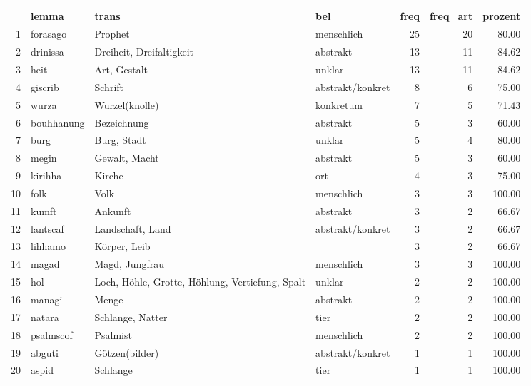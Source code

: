 \begin{tabular}{rlllrrr}
  \hline
 & lemma & trans & bel & freq & freq\_art & prozent \\ 
  \hline
1 & forasago & Prophet & menschlich &  25 &  20 & 80.00 \\ 
  2 & drinissa & Dreiheit, Dreifaltigkeit & abstrakt &  13 &  11 & 84.62 \\ 
  3 & heit & Art, Gestalt & unklar &  13 &  11 & 84.62 \\ 
  4 & giscrib & Schrift & abstrakt/konkret &   8 &   6 & 75.00 \\ 
  5 & wurza & Wurzel(knolle) & konkretum &   7 &   5 & 71.43 \\ 
  6 & bouhhanung & Bezeichnung & abstrakt &   5 &   3 & 60.00 \\ 
  7 & burg & Burg, Stadt & unklar &   5 &   4 & 80.00 \\ 
  8 & megin & Gewalt, Macht & abstrakt &   5 &   3 & 60.00 \\ 
  9 & kirihha & Kirche & ort &   4 &   3 & 75.00 \\ 
  10 & folk & Volk & menschlich &   3 &   3 & 100.00 \\ 
  11 & kumft & Ankunft & abstrakt &   3 &   2 & 66.67 \\ 
  12 & lantscaf & Landschaft, Land & abstrakt/konkret &   3 &   2 & 66.67 \\ 
  13 & lihhamo & Körper, Leib &  &   3 &   2 & 66.67 \\ 
  14 & magad & Magd, Jungfrau & menschlich &   3 &   3 & 100.00 \\ 
  15 & hol & Loch, Höhle, Grotte, Höhlung, Vertiefung, Spalt & unklar &   2 &   2 & 100.00 \\ 
  16 & managi & Menge & abstrakt &   2 &   2 & 100.00 \\ 
  17 & natara & Schlange, Natter & tier &   2 &   2 & 100.00 \\ 
  18 & psalmscof & Psalmist & menschlich &   2 &   2 & 100.00 \\ 
  19 & abguti & Götzen(bilder) & abstrakt/konkret &   1 &   1 & 100.00 \\ 
  20 & aspid & Schlange & tier &   1 &   1 & 100.00 \\ 
   \hline
\end{tabular}
